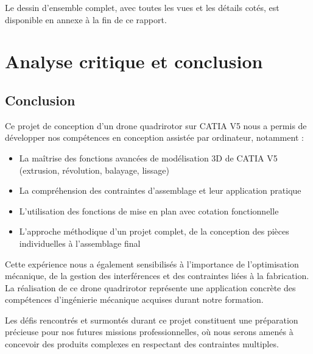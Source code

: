 \documentclass[a4paper,12pt]{report}
\begin{document}
Le dessin d'ensemble complet, avec toutes les vues et les détails cotés, est disponible en annexe à la fin de ce rapport.

\chapter{Analyse critique et conclusion}
\section{Conclusion}

Ce projet de conception d'un drone quadrirotor sur CATIA V5 nous a permis de développer nos compétences en conception assistée par ordinateur, notamment :

\begin{itemize}
    \item La maîtrise des fonctions avancées de modélisation 3D de CATIA V5 (extrusion, révolution, balayage, lissage)
    \item La compréhension des contraintes d'assemblage et leur application pratique
    \item L'utilisation des fonctions de mise en plan avec cotation fonctionnelle
    \item L'approche méthodique d'un projet complet, de la conception des pièces individuelles à l'assemblage final
\end{itemize}

Cette expérience nous a également sensibilisés à l'importance de l'optimisation mécanique, de la gestion des interférences et des contraintes liées à la fabrication. La réalisation de ce drone quadrirotor représente une application concrète des compétences d'ingénierie mécanique acquises durant notre formation.

Les défis rencontrés et surmontés durant ce projet constituent une préparation précieuse pour nos futures missions professionnelles, où nous serons amenés à concevoir des produits complexes en respectant des contraintes multiples.
\end{document}
